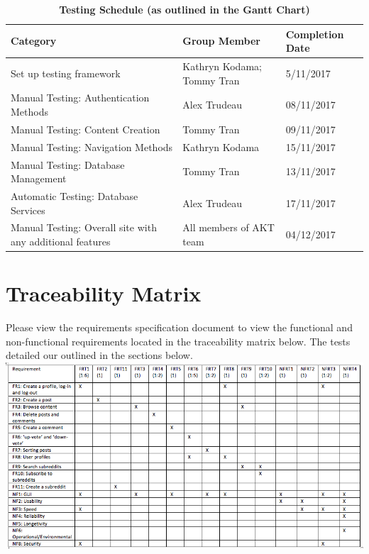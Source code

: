 \documentclass[12pt,fleqn]{article}
\begin{document}
\begin{table}[ht]
\caption{\bf Testing Schedule (as outlined in the Gantt Chart)}
\begin{tabularx}{\textwidth}{p{7cm}p{5cm}X}
\toprule {\bf Category} & {\bf Group Member} & {\bf Completion Date}\\
\midrule
Set up testing framework & Kathryn Kodama; Tommy Tran & 5/11/2017 \\
Manual Testing: Authentication Methods & Alex Trudeau & 08/11/2017\\
Manual Testing: Content Creation & Tommy Tran & 09/11/2017 \\
Manual Testing: Navigation Methods & Kathryn Kodama & 15/11/2017\\ 
Manual Testing: Database Management & Tommy Tran & 13/11/2017\\
Automatic Testing: Database Services & Alex Trudeau & 17/11/2017\\
Manual Testing: Overall site with any additional features & All members of AKT team & 04/12/2017\\
\bottomrule
\end{tabularx}
\end{table}


\pagebreak

\section{Traceability Matrix}
Please view the requirements specification document to view the functional and non-functional requirements located in the traceability matrix below.  The tests detailed our outlined in the sections below.\\
\newline
\includegraphics[scale=0.55]{matrix.png}
\end{document}
